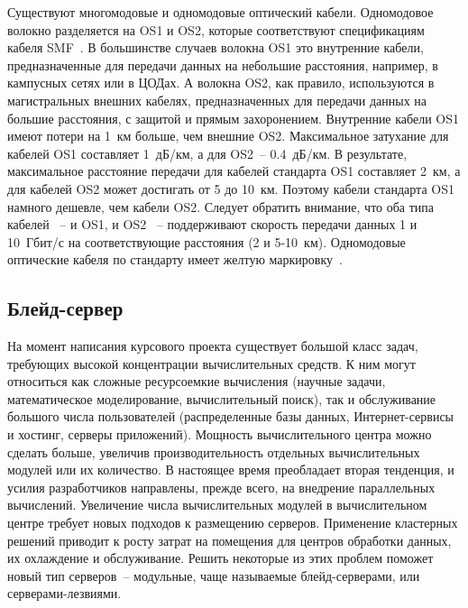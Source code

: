 Существуют многомодовые и одномодовые оптический кабели. Одномодовое волокно разделяется на OS1 и OS2, которые соответствуют спецификациям кабеля SMF~\cite{optovolokno_what_is}. В большинстве случаев волокна OS1 это внутренние кабели, предназначенные для передачи данных на небольшие расстояния, например, в кампусных сетях или в ЦОДах. А волокна OS2, как правило, используются в магистральных внешних кабелях, предназначенных для передачи данных на большие расстояния, с защитой и прямым захоронением. Внутренние кабели OS1 имеют потери на 1~км больше, чем внешние OS2. Максимальное затухание для кабелей OS1 составляет 1~дБ/км, а для OS2~-- 0.4~дБ/км. В результате, максимальное расстояние передачи для кабелей стандарта OS1 составляет 2~км, а для кабелей OS2 может достигать от 5 до 10~км. Поэтому кабели стандарта OS1 намного дешевле, чем кабели OS2. Следует обратить внимание, что оба типа кабелей ~-- и OS1, и OS2 ~-- поддерживают скорость передачи данных 1 и 10~Гбит/с на соответствующие расстояния (2 и 5-10~км). Одномодовые оптические кабеля по стандарту имеет желтую маркировку~\cite{optovolokno_color}.

\subsection{Блейд-сервер}

На момент написания курсового проекта существует большой класс задач, требующих высокой концентрации вычислительных средств. К ним могут относиться как сложные ресурсоемкие вычисления (научные задачи, математическое моделирование, вычислительный поиск), так и обслуживание большого числа пользователей (распределенные базы данных, Интернет-сервисы и хостинг, серверы приложений). Мощность вычислительного центра можно сделать больше, увеличив производительность отдельных вычислительных модулей или их количество. В настоящее время преобладает вторая тенденция, и усилия разработчиков направлены, прежде всего, на внедрение параллельных вычислений. Увеличение числа вычислительных модулей в вычислительном центре требует новых подходов к размещению серверов. Применение кластерных решений приводит к росту затрат на помещения для центров обработки данных, их охлаждение и обслуживание. Решить некоторые из этих проблем поможет новый тип серверов~-- модульные, чаще называемые блейд-серверами, или серверами-лезвиями.

